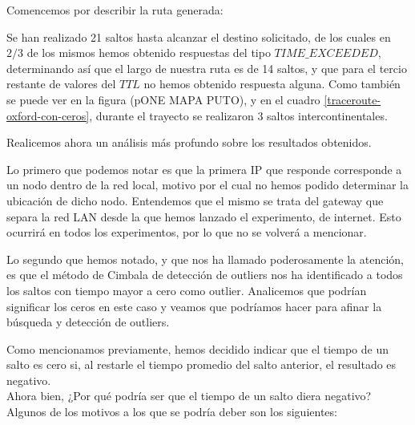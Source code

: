 Comencemos por describir la ruta generada:

Se han realizado 21 saltos hasta alcanzar el destino solicitado, de los cuales en $2/3$ de los mismos hemos obtenido respuestas del tipo $TIME\_EXCEEDED$, determinando así que el largo de nuestra ruta es de 14 saltos, y que para el tercio restante de valores del $TTL$ no hemos obtenido respuesta alguna. Como también se puede ver en la figura (pONE MAPA PUTO), y en el cuadro \ref{traceroute-oxford-con-ceros}, durante el trayecto se realizaron 3 saltos intercontinentales.

Realicemos ahora un análisis más profundo sobre los resultados obtenidos.

Lo primero que podemos notar es que la primera IP que responde corresponde a un nodo dentro de la red local, motivo por el cual no hemos podido determinar la ubicación de dicho nodo. Entendemos que el mismo se trata del gateway que separa la red LAN desde la que hemos lanzado el experimento, de internet. Esto ocurrirá en todos los experimentos, por lo que no se volverá a mencionar. 

Lo segundo que hemos notado, y que nos ha llamado poderosamente la atención, es que el método de Cimbala de detección de outliers nos ha identificado a todos los saltos con tiempo mayor a cero como outlier. Analicemos que podrían significar los ceros en este caso y veamos que podríamos hacer para afinar la búsqueda y detección de outliers.

Como mencionamos previamente, hemos decidido indicar que el tiempo de un salto es cero si, al restarle el tiempo promedio del salto anterior, el resultado es negativo. \\
Ahora bien, ¿Por qué podría ser que el tiempo de un salto diera negativo? \\
Algunos de los motivos a los que se podría deber son los siguientes:

